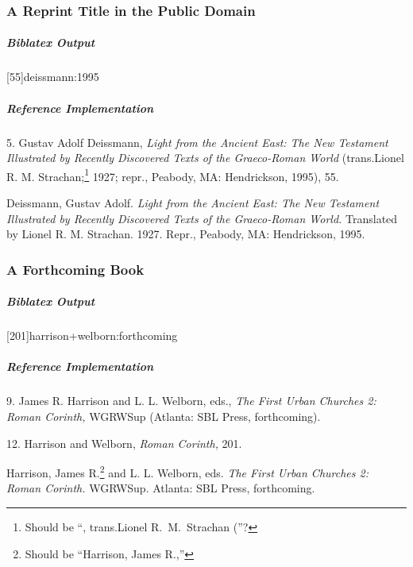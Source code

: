 \documentclass[a4paper]{article}
\newenvironment{biboutput}{%
  \subparagraph{Biblatex Output}
}{\color{black}}
\newenvironment{refimp}{%
  \subparagraph{Reference Implementation}
  \color{reference-colour}
  \rm
}{\par\color{black}}
\begin{document}
\subsubsection{A Reprint Title in the Public Domain}

\begin{biboutput}
  [55]{deissmann:1995}
\end{biboutput}

\begin{refimp}
  \hspace*{\bibindent}5. Gustav Adolf Deissmann, \emph{Light from the Ancient
  East: The New Testament Illustrated by Recently Discovered Texts of the
  Graeco-Roman World} (trans.\@ Lionel R. M. Strachan;\footnote{Should be “,
  trans.\@ Lionel R.\ M.\ Strachan (”?} 1927; repr., Peabody, MA: Hendrickson,
  1995), 55.

  \hangindent\bibindent Deissmann, Gustav Adolf. \emph{Light from the Ancient
  East: The New Testament Illustrated by Recently Discovered Texts of the
  Graeco-Roman World.} Translated by Lionel R. M. Strachan. 1927. Repr., Peabody,
  MA: Hendrickson, 1995.
\end{refimp}

\subsubsection{A Forthcoming Book}

\begin{biboutput}
  [201]{harrison+welborn:forthcoming}
\end{biboutput}

\begin{refimp}
  \hspace*{\bibindent}9. James R. Harrison and L. L. Welborn, eds., \emph{The
  First Urban Churches 2: Roman Corinth,} WGRWSup (Atlanta: SBL Press,
  forthcoming).

  \hspace*{\bibindent}12. Harrison and Welborn, \emph{Roman Corinth,} 201.

  \hangindent\bibindent Harrison, James R.\footnote{Should be “Harrison, James
  R.,”} and L. L. Welborn, eds. \emph{The First Urban Churches 2: Roman
  Corinth.} WGRWSup. Atlanta: SBL Press, forthcoming.

\end{refimp}
\end{document}
